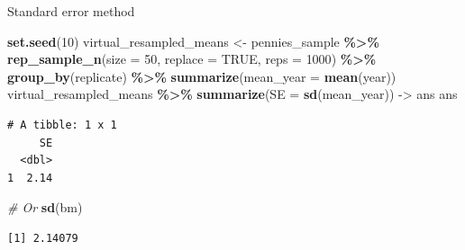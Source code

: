 \documentclass[
  ignorenonframetext,
]{beamer}
\newenvironment{Shaded}{\begin{snugshade}}{\end{snugshade}}
\newcommand{\AttributeTok}[1]{\textcolor[rgb]{0.13,0.29,0.53}{#1}}
\newcommand{\CommentTok}[1]{\textcolor[rgb]{0.56,0.35,0.01}{\textit{#1}}}
\newcommand{\ConstantTok}[1]{\textcolor[rgb]{0.56,0.35,0.01}{#1}}
\newcommand{\DecValTok}[1]{\textcolor[rgb]{0.00,0.00,0.81}{#1}}
\newcommand{\FunctionTok}[1]{\textcolor[rgb]{0.13,0.29,0.53}{\textbf{#1}}}
\newcommand{\NormalTok}[1]{#1}
\newcommand{\OtherTok}[1]{\textcolor[rgb]{0.56,0.35,0.01}{#1}}
\newcommand{\SpecialCharTok}[1]{\textcolor[rgb]{0.81,0.36,0.00}{\textbf{#1}}}
\begin{document}
\begin{frame}[fragile]{Standard error method}
\protect\hypertarget{standard-error-method-1}{}
\small

\begin{Shaded}
\begin{Highlighting}[]
\FunctionTok{set.seed}\NormalTok{(}\DecValTok{10}\NormalTok{)}
\NormalTok{virtual\_resampled\_means }\OtherTok{\textless{}{-}}\NormalTok{ pennies\_sample }\SpecialCharTok{\%\textgreater{}\%} 
  \FunctionTok{rep\_sample\_n}\NormalTok{(}\AttributeTok{size =} \DecValTok{50}\NormalTok{, }\AttributeTok{replace =} \ConstantTok{TRUE}\NormalTok{, }\AttributeTok{reps =} \DecValTok{1000}\NormalTok{) }\SpecialCharTok{\%\textgreater{}\%} 
  \FunctionTok{group\_by}\NormalTok{(replicate) }\SpecialCharTok{\%\textgreater{}\%} 
  \FunctionTok{summarize}\NormalTok{(}\AttributeTok{mean\_year =} \FunctionTok{mean}\NormalTok{(year))}
\NormalTok{virtual\_resampled\_means }\SpecialCharTok{\%\textgreater{}\%} 
  \FunctionTok{summarize}\NormalTok{(}\AttributeTok{SE =} \FunctionTok{sd}\NormalTok{(mean\_year)) }\OtherTok{{-}\textgreater{}}\NormalTok{ ans}
\NormalTok{ans}
\end{Highlighting}
\end{Shaded}

\begin{verbatim}
# A tibble: 1 x 1
     SE
  <dbl>
1  2.14
\end{verbatim}

\begin{Shaded}
\begin{Highlighting}[]
\CommentTok{\# Or}
\FunctionTok{sd}\NormalTok{(bm)}
\end{Highlighting}
\end{Shaded}

\begin{verbatim}
[1] 2.14079
\end{verbatim}
\end{frame}
\end{document}
